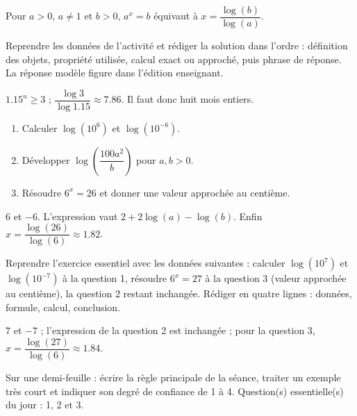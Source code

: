 \begin{summary}Pour $a>0$, $a\neq1$ et $b>0$, $a^x=b$ équivaut à $x=\dfrac{\log(b)}{\log(a)}$.\end{summary}

\begin{example}
Reprendre les données de l'activité et rédiger la solution dans l'ordre : définition des objets, propriété utilisée, calcul exact ou approché, puis phrase de réponse. La réponse modèle figure dans l'édition enseignant.
\end{example}
\begin{solution}$\num{1,15}^n\geq3$ ; $\dfrac{\log3}{\log\num{1,15}}\approx\num{7,86}$. Il faut donc huit mois entiers.\end{solution}

\begin{exercise}[essentiel]
\begin{enumerate}\item Calculer $\log(10^6)$ et $\log(10^{-6})$.\item Développer $\log\!\left(\dfrac{100a^2}{b}\right)$ pour $a,b>0$.\item Résoudre $6^x=26$ et donner une valeur approchée au centième.\end{enumerate}
\end{exercise}
\begin{solution}$6$ et $-6$. L'expression vaut $2+2\log(a)-\log(b)$. Enfin $x=\dfrac{\log(26)}{\log(6)}\approx\num{1,82}$.\end{solution}


\begin{homework}Reprendre l'exercice essentiel avec les données suivantes : calculer $\log(10^{7})$ et $\log(10^{-7})$ à la question 1, résoudre $6^x=27$ à la question 3 (valeur approchée au centième), la question 2 restant inchangée. Rédiger en quatre lignes : données, formule, calcul, conclusion.\end{homework}
\begin{solution}$7$ et $-7$ ; l'expression de la question 2 est inchangée ; pour la question 3, $x=\dfrac{\log(27)}{\log(6)}\approx\num{1,84}$.\end{solution}

\begin{exitticket}[3 minutes]Sur une demi-feuille : écrire la règle principale de la séance, traiter un exemple très court et indiquer son degré de confiance de 1 à 4. Question(s) essentielle(s) du jour : 1, 2 et 3.\end{exitticket}

